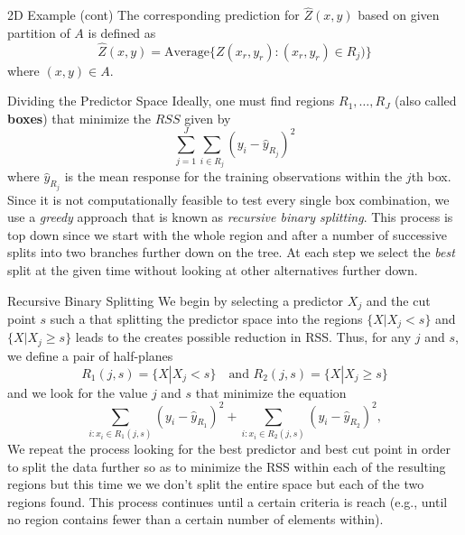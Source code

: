 \documentclass{beamer}
\begin{document}
\begin{frame}{2D Example (cont)}
The corresponding prediction for $\widehat{Z}(x,y)$ based on given partition of $A$ is defined as 
\begin{equation*}
	\widehat{Z}(x,y)= \textrm{Average} \{ Z(x_r,y_r)\colon (x_r ,y_r)\in R_j)\}
\end{equation*}
where $(x,y) \in A$.

\end{frame}

\begin{frame}{Dividing the Predictor Space}
	Ideally, one must find regions $R_1, \ldots, R_J$ (also called {\bf boxes}) that minimize the $RSS$ given by 
	\begin{equation*}
		\sum_{j=1}^J \sum_{i\in R_j} (y_i - \hat{y}_{R_j})^2
	\end{equation*}
where $\hat{y}_{R_j}$ is the mean response for the training observations within the $j$th box. Since it is not computationally feasible to test every single box combination, we use a {\it greedy} approach that is known as {\it recursive binary splitting}. This process is top down since we start with the whole region and after a number of successive splits into two branches further down on the tree. At each step we select the {\it best} split at the given time without looking at other alternatives further down. 
\end{frame}

\begin{frame}{Recursive Binary Splitting}
	We begin by selecting a predictor $X_j$ and the cut point $s$ such a that splitting the predictor space into the regions $\{ X| X_j <s \}$ and $\{ X | X_j \ge s\}$ leads to the creates possible reduction in RSS. Thus, for any $j$ and $s$, we define a pair of half-planes
	\begin{equation}
		R_1(j,s)= \{ X | X_j <s\} \quad \textrm{and } R_2(j,s)= \{X| X_j\ge s\}
		\label{eq:rbs1}
	\end{equation}
and we look for the value $j$ and $s$ that minimize the equation
\begin{equation}
	\sum_{i: x_i \in R_1(j,s)} (y_i - \hat{y}_{R_1})^2 + 	\sum_{i: x_i \in R_2(j,s)} (y_i - \hat{y}_{R_2})^2 ,
	\label{eq:rbs2}
\end{equation}
We repeat the process looking for the best predictor and best cut point in order to split the data further so as to minimize the RSS within each of the resulting regions but this time we we don't split the entire space but each of the two regions found. This process continues until a certain criteria is reach (e.g., until no region contains fewer than a certain number of elements within). 


\end{frame}
\end{document}
